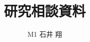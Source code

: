 \documentclass[a4]{jarticle}
\title{研究相談資料}
\author{M1 石井 翔} %
\begin{document}
\twocolumn{
\maketitle
}

%

\nocite{*}
\small
\end{document}
